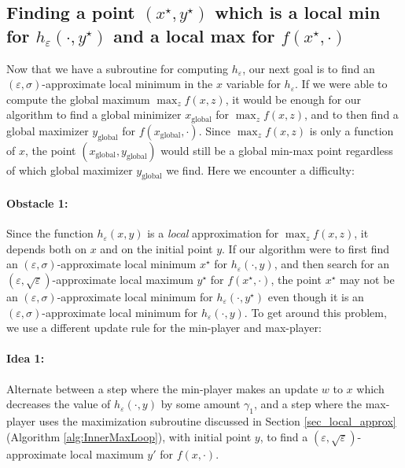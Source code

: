 \documentclass[11pt,letterpaper]{article}
\renewcommand{\epsilon}{\varepsilon}
\begin{document}
 

 
\subsection{Finding a point $(x^\star, y^\star)$ which is a local min for $h_\epsilon(\cdot, y^\star)$ and a local max for $f(x^\star, \cdot)$} \label{sec_local_min_local_max}

%
Now that we have a subroutine for computing $h_\epsilon$, our next goal is to find an $(\epsilon, \sigma)$-approximate local minimum in the $x$ variable for $h_\epsilon$.
%
If we were able to compute the global maximum $\max_{z} f(x,z)$, it would be enough for our algorithm to find a global minimizer $x_{\mathrm{global}}$ for $\max_{z} f(x,z)$, and to then find a global maximizer $y_{\mathrm{global}}$ for $f(x_{\mathrm{global}}, \cdot)$.
%
Since $\max_{z} f(x,z)$ is only a function of $x$, the point $(x_{\mathrm{global}}, y_{\mathrm{global}})$ would still be a global min-max point regardless of which global maximizer $y_{\mathrm{global}}$ we find.
%
Here we encounter a difficulty:
%
\paragraph{Obstacle 1:}
%
%
Since the function $h_\epsilon(x,y)$ is a {\em local} approximation for $\max_z f(x,z)$, it depends both on $x$ and on the initial point $y$.
%
 If our algorithm were to first find an $(\epsilon, \sigma)$-approximate local minimum $x^\star$ for $h_\epsilon(\cdot, y)$, and then search for an  $(\epsilon, \sqrt{ \epsilon})$-approximate local maximum $y^\star$ for $f(x^\star, \cdot)$, the point  $x^\star$ may not be an $(\epsilon, \sigma)$-approximate local minimum for  $h_\epsilon(\cdot, y^\star)$ even though it is an $(\epsilon, \sigma)$-approximate local minimum for $h_\epsilon(\cdot, y)$.
%
To get around this problem, we use a different update rule for the min-player and max-player:
 \paragraph{Idea 1:} Alternate between a step where the min-player makes an update $w$ to $x$ which decreases the value of $h_\epsilon(\cdot, y)$ by some amount $\gamma_1$, and a step where the max-player uses the maximization subroutine discussed in Section \ref{sec_local_approx}  (Algorithm \ref{alg:InnerMaxLoop}), with initial point $y$, to find a $(\epsilon, \sqrt{ \epsilon})$-approximate local maximum $y'$ for $f(x, \cdot)$.
\end{document}
